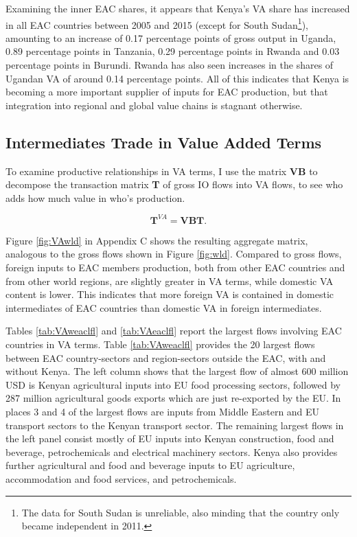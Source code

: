 \documentclass[a4paper]{article}
\begin{document}
Examining the inner EAC shares, it appears that Kenya's VA share has increased in all EAC countries between 2005 and 2015 (except for South Sudan\footnote{The data for South Sudan is unreliable, also minding that the country only became independent in 2011.}), amounting to an increase of 0.17 percentage points of gross output in Uganda, 0.89 percentage points in Tanzania, 0.29 percentage points in Rwanda and 0.03 percentage points in Burundi. Rwanda has also seen increases in the shares of Ugandan VA of around 0.14 percentage points. All of this indicates that Kenya is becoming a more important supplier of inputs for EAC production, but that integration into regional and global value chains is stagnant otherwise. 


\subsection{Intermediates Trade in Value Added Terms}

To examine productive relationships in VA terms, I use the matrix \textbf{VB} to decompose the transaction matrix \textbf{T} of gross IO flows into VA flows, to see who adds how much value in who's production.  

\begin{equation}
\textbf{T}^{VA} = \textbf{VB} \textbf{T}.
\end{equation} 

Figure \ref{fig:VAwld} in Appendix C shows the resulting aggregate matrix, analogous to the gross flows shown in Figure \ref{fig:wld}. Compared to gross flows, foreign inputs to EAC members production, both from other EAC countries and from other world regions, are slightly greater in VA terms, while domestic VA content is lower. This indicates that more foreign VA is contained in domestic intermediates of EAC countries than domestic VA in foreign intermediates. \newline

Tables \ref{tab:VAweaclfl} and \ref{tab:VAeaclfl} report the largest flows involving EAC countries in VA terms. Table \ref{tab:VAweaclfl} provides the 20 largest flows between EAC country-sectors and region-sectors outside the EAC, with and without Kenya. The left column shows that the largest flow of almost 600 million USD is Kenyan agricultural inputs into EU food processing sectors, followed by 287 million agricultural goods exports which are just re-exported by the EU. In places 3 and 4 of the largest flows are inputs from Middle Eastern and EU transport sectors to the Kenyan transport sector. The remaining largest flows in the left panel consist mostly of EU inputs into Kenyan construction, food and beverage, petrochemicals and electrical machinery sectors. Kenya also provides further agricultural and food and beverage inputs to EU agriculture, accommodation and food services, and petrochemicals.
\end{document}
